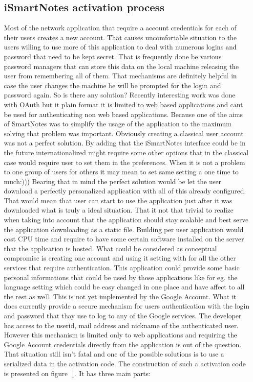 \subsection{iSmartNotes activation process}\label{subsec:ismartnotes_activation}
Most of the network application that require a account credentials for each of their users creates a new account. That causes uncomfortable situation to the users willing to use more of this application to deal with numerous logins and password that need to be kept secret. That is frequently done be various password managers that can store this data on the local machine releasing the user from remembering all of them. That mechanisms are definitely helpful in case the user changes the machine he will be prompted for the login and password again. So is there any solution? Recently interesting work was done with OAuth but it plain format it is limited to web based applications and cant be used for authenticating non web based applications. Because one of the aims of SmartNotes was to simplify the usage of the application to the maximum solving that problem was important. Obviously creating a classical user account was not a perfect solution. By adding that the iSmartNotes interface could be in the future internationalized might require some other options that in the classical case would require user to set them in the preferences. When it is not a problem to one group of users for others it may mean to set same setting a one time to much:))) Bearing that in mind the perfect solution would be let the user download a perfectly personalized application with all of this already configured. That would mean that user can start to use the application just after it was downloaded what is truly a ideal situation. That it not that trivial to realize when taking into account that the application should stay scalable and best serve the application downloading as a static file. Building per user application would cost CPU time and require to have some certain software installed on the server that the application is hosted. What could be considered as conceptual compromise is creating one account and using it setting with for all the other services that require authentication. This application could provide some basic personal informations that could be used by those applications like for eg. the language setting which could be easy changed in one place and have affect to all the rest as well. This is not yet implemented by the Google Account. What it does currently provide a secure mechanism for users authentication with the login and password that thay use to log to any of the Google services. The developer has access to the userid, mail address and nickname of the authenticated user. However this mechanism is limited only to web applications and requiring the Google Account credentials directly from the application is out of the question. That situation still isn't fatal and one of the possible solutions is to use a serialized data in the activation code. The construction of such a activation code is presented on figure~\ref{}. It has three main parts:
